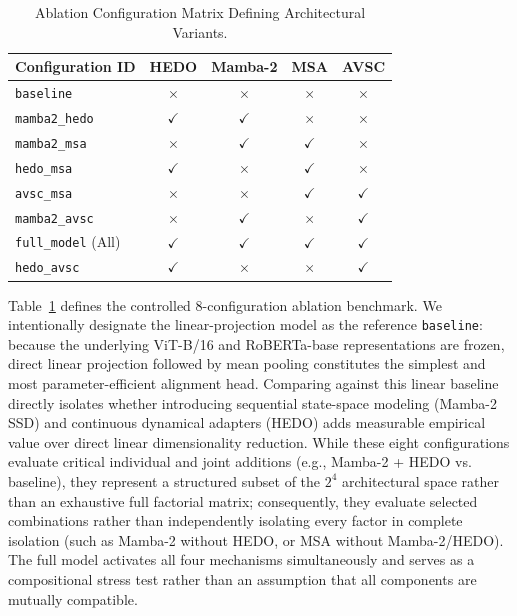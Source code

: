 \documentclass[conference]{IEEEtran}
\begin{document}
\begin{table}[htbp]
\centering
\caption{Ablation Configuration Matrix Defining Architectural Variants.}
\label{tab:configurations}
\begin{tabular}{lcccc}
\toprule
\textbf{Configuration ID} & \textbf{HEDO} & \textbf{Mamba-2} & \textbf{MSA} & \textbf{AVSC} \\
\midrule
\texttt{baseline} & $\times$ & $\times$ & $\times$ & $\times$ \\
\texttt{mamba2\_hedo} & $\checkmark$ & $\checkmark$ & $\times$ & $\times$ \\
\texttt{mamba2\_msa} & $\times$ & $\checkmark$ & $\checkmark$ & $\times$ \\
\texttt{hedo\_msa} & $\checkmark$ & $\times$ & $\checkmark$ & $\times$ \\
\texttt{avsc\_msa} & $\times$ & $\times$ & $\checkmark$ & $\checkmark$ \\
\texttt{mamba2\_avsc} & $\times$ & $\checkmark$ & $\times$ & $\checkmark$ \\
\texttt{full\_model} (All) & $\checkmark$ & $\checkmark$ & $\checkmark$ & $\checkmark$ \\
\texttt{hedo\_avsc} & $\checkmark$ & $\times$ & $\times$ & $\checkmark$ \\
\bottomrule
\end{tabular}
\end{table}

Table~\ref{tab:configurations} defines the controlled 8-configuration ablation benchmark. We intentionally designate the linear-projection model as the reference \texttt{baseline}: because the underlying ViT-B/16 and RoBERTa-base representations are frozen, direct linear projection followed by mean pooling constitutes the simplest and most parameter-efficient alignment head. Comparing against this linear baseline directly isolates whether introducing sequential state-space modeling (Mamba-2 SSD) and continuous dynamical adapters (HEDO) adds measurable empirical value over direct linear dimensionality reduction. While these eight configurations evaluate critical individual and joint additions (e.g., Mamba-2 + HEDO vs. baseline), they represent a structured subset of the $2^4$ architectural space rather than an exhaustive full factorial matrix; consequently, they evaluate selected combinations rather than independently isolating every factor in complete isolation (such as Mamba-2 without HEDO, or MSA without Mamba-2/HEDO). The full model activates all four mechanisms simultaneously and serves as a compositional stress test rather than an assumption that all components are mutually compatible.
\end{document}
